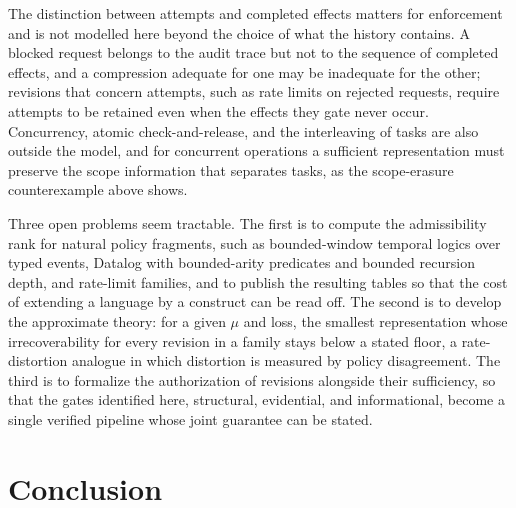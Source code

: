 \documentclass[11pt]{article}
\theoremstyle{definition}
\theoremstyle{remark}
\begin{document}
The distinction between attempts and completed effects matters for enforcement and is not modelled here beyond the choice of what the history contains. A blocked request belongs to the audit trace but not to the sequence of completed effects, and a compression adequate for one may be inadequate for the other; revisions that concern attempts, such as rate limits on rejected requests, require attempts to be retained even when the effects they gate never occur. Concurrency, atomic check-and-release, and the interleaving of tasks are also outside the model, and for concurrent operations a sufficient representation must preserve the scope information that separates tasks, as the scope-erasure counterexample above shows.

Three open problems seem tractable. The first is to compute the admissibility rank for natural policy fragments, such as bounded-window temporal logics over typed events, Datalog with bounded-arity predicates and bounded recursion depth, and rate-limit families, and to publish the resulting tables so that the cost of extending a language by a construct can be read off. The second is to develop the approximate theory: for a given $\mu$ and loss, the smallest representation whose irrecoverability for every revision in a family stays below a stated floor, a rate-distortion analogue in which distortion is measured by policy disagreement. The third is to formalize the authorization of revisions alongside their sufficiency, so that the gates identified here, structural, evidential, and informational, become a single verified pipeline whose joint guarantee can be stated.

\section{Conclusion}
\end{document}
